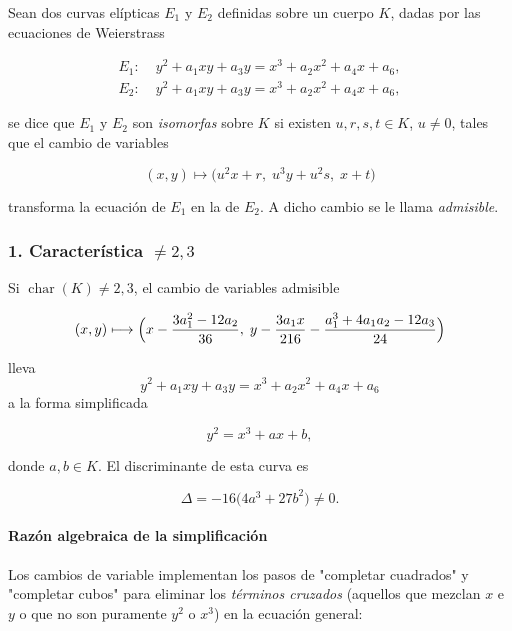 \begin{definicion}
Sean dos curvas elípticas $E_1$ y $E_2$ definidas sobre un cuerpo $K$, dadas por las ecuaciones de Weierstrass

\[
\begin{aligned}
E_1:\; & y^2 + a_1 x y + a_3 y = x^3 + a_2 x^2 + a_4 x + a_6,\\
E_2:\; & y^2 + a_1 x y + a_3 y = x^3 + a_2 x^2 + a_4 x + a_6,
\end{aligned}
\]

se dice que $E_1$ y $E_2$ son \emph{isomorfas} sobre $K$ si existen $u,r,s,t\in K$, $u\neq0$, tales que el cambio de variables

\begin{equation}\label{eq:cambio_admisible}
(x,y)\longmapsto\bigl(u^2x + r,\;u^3y + u^2s,\;x + t\bigr)
\end{equation}

transforma la ecuación de $E_1$ en la de $E_2$. A dicho cambio se le llama \emph{admisible}.
\end{definicion}

\subsubsection*{1. Característica $\neq2,3$}

Si $\operatorname{char}(K)\neq2,3$, el cambio de variables admisible

\[
(x,y)\longmapsto\Bigl(x - \frac{3a_1^2 - 12a_2}{36},\;y - \frac{3a_1x}{216} - \frac{a_1^3 + 4a_1a_2 - 12a_3}{24}\Bigr)
\]

lleva
\[
y^2 + a_1xy + a_3y = x^3 + a_2x^2 + a_4x + a_6
\]
a la forma simplificada

\begin{equation}\label{eq:weierstrass_simple}
y^2 = x^3 + a x + b,
\end{equation}

donde $a,b\in K$. El discriminante de esta curva es

\[
\Delta = -16\bigl(4a^3 + 27b^2\bigr)\neq0.
\]

\paragraph{Razón algebraica de la simplificación}
Los cambios de variable implementan los pasos de "completar cuadrados" y "completar cubos" para eliminar los \emph{términos cruzados} (aquellos que mezclan $x$ e $y$ o que no son puramente $y^2$ o $x^3$) en la ecuación general:

